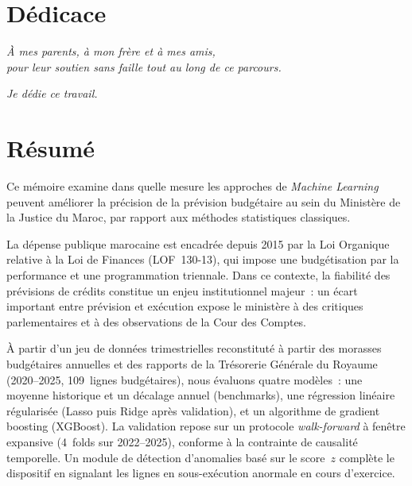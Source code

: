 \documentclass[12pt,a4paper]{article}
\begin{document}
\newpage

\section*{D\'edicace}

\begin{center}
\vspace*{3cm}

\textit{\`A mes parents, \`a mon fr\`ere et \`a mes amis,}\\[6pt]
\textit{pour leur soutien sans faille tout au long de ce parcours.}

\vspace{1.2cm}

\textit{Je d\'edie ce travail.}

\end{center}

\newpage

\section*{R\'esum\'e}

Ce m\'emoire examine dans quelle mesure les approches de \textit{Machine Learning} peuvent am\'eliorer la pr\'ecision de la pr\'evision budg\'etaire au sein du Minist\`ere de la Justice du Maroc, par rapport aux m\'ethodes statistiques classiques.

La d\'epense publique marocaine est encadr\'ee depuis 2015 par la Loi Organique relative \`a la Loi de Finances (LOF~130-13), qui impose une budg\'etisation par la performance et une programmation triennale. Dans ce contexte, la fiabilit\'e des pr\'evisions de cr\'edits constitue un enjeu institutionnel majeur~: un \'ecart important entre pr\'evision et ex\'ecution expose le minist\`ere \`a des critiques parlementaires et \`a des observations de la Cour des Comptes.

\`A partir d'un jeu de donn\'ees trimestrielles reconstitut\'e \`a partir des morasses budg\'etaires annuelles et des rapports de la Tr\'esorerie G\'en\'erale du Royaume (2020--2025, 109~lignes budg\'etaires), nous \'evaluons quatre mod\`eles~: une moyenne historique et un d\'ecalage annuel (benchmarks), une r\'egression lin\'eaire r\'egularis\'ee (Lasso puis Ridge apr\`es validation), et un algorithme de gradient boosting (XGBoost). La validation repose sur un protocole \textit{walk-forward} \`a fen\^etre expansive (4~folds sur 2022--2025), conforme \`a la contrainte de causalit\'e temporelle. Un module de d\'etection d'anomalies bas\'e sur le score~$z$ compl\`ete le dispositif en signalant les lignes en sous-ex\'ecution anormale en cours d'exercice.
\end{document}
